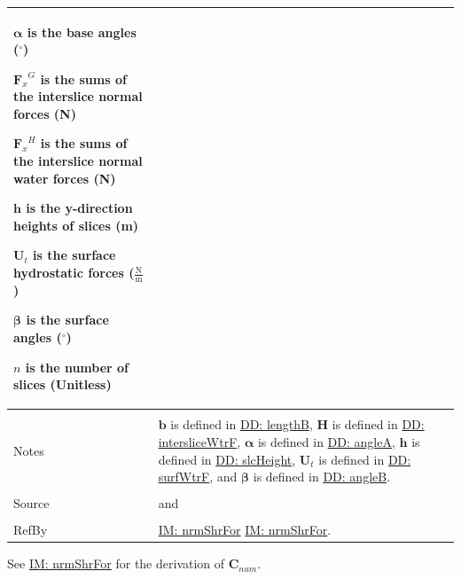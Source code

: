 \documentclass[12pt]{article}
\begin{document}
\begin{minipage}{\textwidth}
\begin{tabular}{p{} p{}}
\begin{symbDescription}
              \item{$\mathbf{α}$ is the base angles (${}^{\circ}$)}
              \item{${{\mathbf{F}_{x}}^{G}}$ is the sums of the interslice normal forces (N)}
              \item{${{\mathbf{F}_{x}}^{H}}$ is the sums of the interslice normal water forces (N)}
              \item{$\mathbf{h}$ is the y-direction heights of slices (m)}
              \item{${\mathbf{U}_{t}}$ is the surface hydrostatic forces ($\frac{\text{N}}{\text{m}}$)}
              \item{$\mathbf{β}$ is the surface angles (${}^{\circ}$)}
              \item{$n$ is the number of slices (Unitless)}
              \end{symbDescription}
\\ \midrule \\
Notes & $\mathbf{b}$ is defined in \hyperref[DD:lengthB]{DD: lengthB}, $\mathbf{H}$ is defined in \hyperref[DD:intersliceWtrF]{DD: intersliceWtrF}, $\mathbf{α}$ is defined in \hyperref[DD:angleA]{DD: angleA}, $\mathbf{h}$ is defined in \hyperref[DD:slcHeight]{DD: slcHeight}, ${\mathbf{U}_{t}}$ is defined in \hyperref[DD:surfWtrF]{DD: surfWtrF}, and $\mathbf{β}$ is defined in \hyperref[DD:angleB]{DD: angleB}.
\\ \midrule \\
Source & \cite{chen2005} and \cite{karchewski2012}
\\ \midrule \\
RefBy & \hyperref[IM:nrmShrFor]{IM: nrmShrFor} \hyperref[IM:nrmShrFor]{IM: nrmShrFor}.
\\ \bottomrule \end{tabular}
\end{minipage}
See \hyperref[IM:nrmShrFor]{IM: nrmShrFor} for the derivation of ${\mathbf{C}_{num}}$.
\par~
\end{document}
